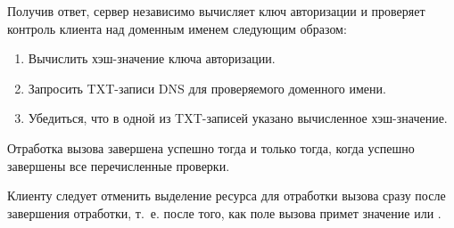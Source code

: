 Получив ответ, сервер независимо вычисляет ключ авторизации и 
проверяет контроль клиента над доменным именем следующим образом:

\begin{enumerate}
\item
Вычислить хэш-значение ключа авторизации.
\item
Запросить TXT-записи DNS для проверяемого доменного имени.
\item
Убедиться, что в одной из TXT-записей указано вычисленное хэш-значение. 
\end{enumerate}

Отработка вызова завершена успешно тогда и только тогда, когда успешно 
завершены все перечисленные проверки.

Клиенту следует отменить выделение ресурса для отработки вызова сразу после 
завершения отработки, т.~е. после того, как поле  вызова примет 
значение  или .
